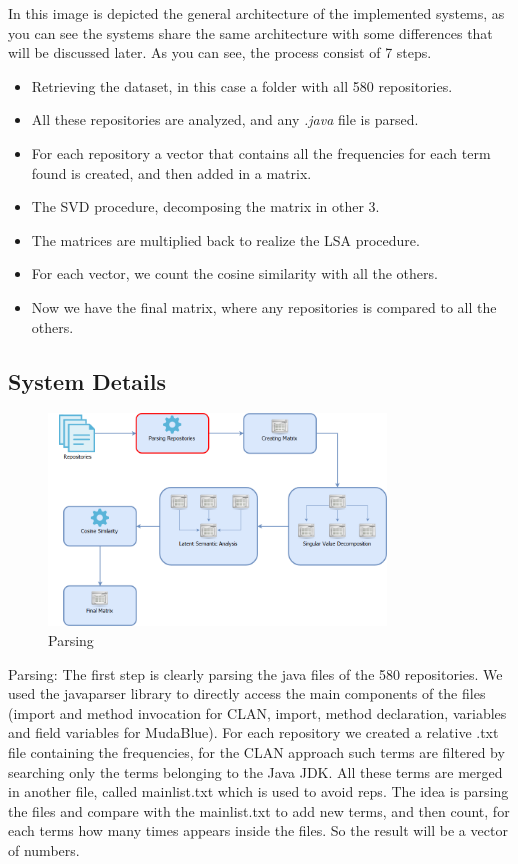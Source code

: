 In this image is depicted the general architecture of the implemented systems, as you can see the systems share the same architecture with some differences that will be discussed later.
As you can see, the process consist of 7 steps.
\begin{itemize}
 \item Retrieving the dataset, in this case a folder with all 580 repositories.
 \item All these repositories are analyzed, and any \emph{.java} file is parsed.
 \item For each repository a vector that contains all the frequencies for each term found is created, and then added in a matrix. 
 \item The SVD procedure, decomposing the matrix in other 3.
 \item The matrices are multiplied back to realize the LSA procedure.
 \item For each vector, we count the cosine similarity with all the others.
 \item Now we have the final matrix, where any repositories is compared to all the others.
\end{itemize} 




\subsection{System Details}

\begin{figure}[!h]
	\centering
	\includegraphics[width=0.8\textwidth]{images/Architecture1.png}
	\caption{Parsing}
\end{figure}


Parsing: The first step is clearly parsing the java files of the 580 repositories. We used the javaparser library to directly access
the main components of the files (import and method invocation for CLAN, import, method declaration, variables and field variables for MudaBlue). For each repository we created a relative .txt file containing the frequencies, for the CLAN approach such terms are filtered by searching only the terms belonging to the Java JDK. All these terms are merged in another file, called mainlist.txt which is used to avoid reps. The idea is parsing the files and compare with the mainlist.txt to add new terms, and then count, for each terms how many times appears inside the files. So the result will be a vector of numbers.

